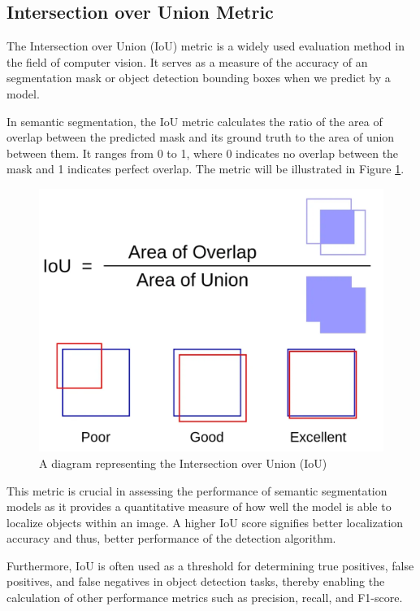 \subsection{Intersection over Union Metric}

The Intersection over Union (IoU) metric is a widely used evaluation method in the field of computer vision. It serves as a measure of the accuracy of an segmentation mask or object detection bounding boxes when we predict by a model.

In semantic segmentation, the IoU metric calculates the ratio of the area of overlap between the predicted mask and its ground truth to the area of union between them. It ranges from 0 to 1, where 0 indicates no overlap between the mask and 1 indicates perfect overlap.
The metric will be illustrated in Figure \ref{metric:iou}.

\begin{figure}[t]
    \centering
    \includegraphics[width=0.5\linewidth]{img/iou.png}
    \caption{A diagram representing the Intersection over Union (IoU)}
    \label{metric:iou}
\end{figure}

This metric is crucial in assessing the performance of semantic segmentation models as it provides a quantitative measure of how well the model is able to localize objects within an image. A higher IoU score signifies better localization accuracy and thus, better performance of the detection algorithm.

Furthermore, IoU is often used as a threshold for determining true positives, false positives, and false negatives in object detection tasks, thereby enabling the calculation of other performance metrics such as precision, recall, and F1-score.


